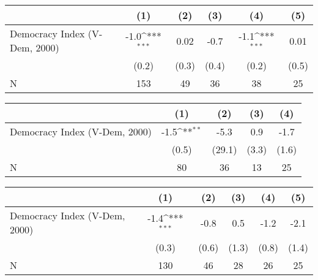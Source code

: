 {
\def\sym#1{\ifmmode^{#1}\else\(^{#1}\)\fi}
\begin{tabular}{l*{5}{c}}
\hline\hline
                    &\multicolumn{1}{c}{(1)}         &\multicolumn{1}{c}{(2)}         &\multicolumn{1}{c}{(3)}         &\multicolumn{1}{c}{(4)}         &\multicolumn{1}{c}{(5)}         \\
\hline
Democracy Index (V-Dem, 2000)&        -1.0\sym{***}&        0.02         &        -0.7         &        -1.1\sym{***}&        0.01         \\
                    &       (0.2)         &       (0.3)         &       (0.4)         &       (0.2)         &       (0.5)         \\
\hline
N                   &         153         &          49         &          36         &          38         &          25         \\
\hline\hline
\end{tabular}
}
{
\def\sym#1{\ifmmode^{#1}\else\(^{#1}\)\fi}
\begin{tabular}{l*{4}{c}}
\hline\hline
                    &\multicolumn{1}{c}{(1)}         &\multicolumn{1}{c}{(2)}         &\multicolumn{1}{c}{(3)}         &\multicolumn{1}{c}{(4)}         \\
\hline
Democracy Index (V-Dem, 2000)&        -1.5\sym{**} &        -5.3         &         0.9         &        -1.7         \\
                    &       (0.5)         &      (29.1)         &       (3.3)         &       (1.6)         \\
\hline
N                   &          80         &          36         &          13         &          25         \\
\hline\hline
\end{tabular}
}
{
\def\sym#1{\ifmmode^{#1}\else\(^{#1}\)\fi}
\begin{tabular}{l*{5}{c}}
\hline\hline
                    &\multicolumn{1}{c}{(1)}         &\multicolumn{1}{c}{(2)}         &\multicolumn{1}{c}{(3)}         &\multicolumn{1}{c}{(4)}         &\multicolumn{1}{c}{(5)}         \\
\hline
Democracy Index (V-Dem, 2000)&        -1.4\sym{***}&        -0.8         &         0.5         &        -1.2         &        -2.1         \\
                    &       (0.3)         &       (0.6)         &       (1.3)         &       (0.8)         &       (1.4)         \\
\hline
N                   &         130         &          46         &          28         &          26         &          25         \\
\hline\hline
\end{tabular}
}
